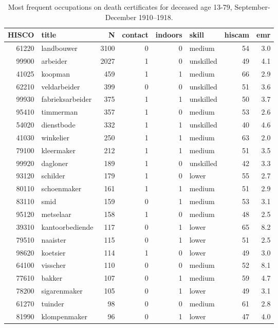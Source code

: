 \begin{table}

\caption{\label{tab:tab:topoccs_selected}Most frequent occupations on death certificates for deceased age 13-79, September-December 1910–1918.}
\centering
\begin{tabular}[t]{r|l|r|r|r|l|r|r}
\hline
HISCO & title & N & contact & indoors & skill & hiscam & emr\\
\hline
61220 & landbouwer & 3100 & 0 & 0 & medium & 54 & 3.0\\
\hline
99900 & arbeider & 2027 & 1 & 0 & unskilled & 49 & 4.1\\
\hline
41025 & koopman & 459 & 1 & 1 & medium & 66 & 2.9\\
\hline
62210 & veldarbeider & 399 & 0 & 0 & unskilled & 51 & 3.6\\
\hline
99930 & fabrieksarbeider & 375 & 1 & 1 & unskilled & 50 & 3.7\\
\hline
95410 & timmerman & 357 & 1 & 0 & medium & 53 & 2.6\\
\hline
54020 & dienstbode & 332 & 1 & 1 & unskilled & 40 & 4.6\\
\hline
41030 & winkelier & 250 & 1 & 1 & medium & 63 & 2.0\\
\hline
79100 & kleermaker & 212 & 1 & 1 & medium & 51 & 3.5\\
\hline
99920 & dagloner & 189 & 1 & 0 & unskilled & 42 & 3.3\\
\hline
93120 & schilder & 179 & 1 & 0 & lower & 55 & 2.7\\
\hline
80110 & schoenmaker & 161 & 1 & 1 & medium & 51 & 2.9\\
\hline
83110 & smid & 159 & 0 & 1 & medium & 53 & 3.1\\
\hline
95120 & metselaar & 158 & 1 & 0 & medium & 48 & 2.5\\
\hline
39310 & kantoorbediende & 117 & 0 & 1 & lower & 65 & 8.2\\
\hline
79510 & naaister & 115 & 0 & 1 & lower & 51 & 2.5\\
\hline
98620 & koetsier & 114 & 1 & 0 & lower & 49 & 3.0\\
\hline
64100 & visscher & 110 & 0 & 0 & medium & 52 & 8.1\\
\hline
77610 & bakker & 107 & 0 & 1 & medium & 59 & 4.7\\
\hline
78200 & sigarenmaker & 105 & 0 & 1 & lower & 49 & 3.1\\
\hline
61270 & tuinder & 98 & 0 & 0 & medium & 61 & 2.8\\
\hline
81990 & klompenmaker & 96 & 0 & 1 & lower & 47 & 4.0\\

\end{tabular}
\end{table}
